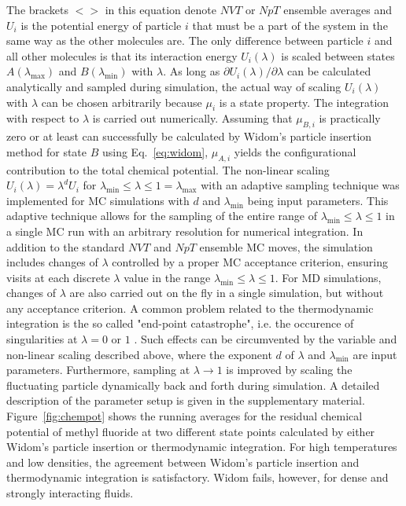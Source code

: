 \documentclass[preprint,12pt]{elsarticle}
\begin{document}
The brackets $<>$ in this equation denote $NVT$ or $NpT$ ensemble averages and $U_i$ is the potential energy of particle $i$ that must be a part of the system in the same way as the other molecules are. The only difference between particle $i$ and all other molecules is that its interaction energy $U_i(\lambda)$ is scaled between states $A(\lambda_\text{max})$ and $B(\lambda_\text{min})$ with $\lambda$. As long as $\partial U_i(\lambda)/\partial \lambda$ can be calculated analytically and sampled during simulation, the actual way of scaling $U_i(\lambda)$ with $\lambda$ can be chosen arbitrarily because $\mu_i$ is a state property. The integration with respect to $\lambda$ is carried out numerically. Assuming that $\mu_{B,i}$ is practically zero or at least can successfully be calculated by Widom’s particle insertion method for state $B$ using Eq.~\eqref{eq:widom}, $\mu_{A,i}$ yields the configurational contribution to the total chemical potential. The non-linear scaling $U_i(\lambda)=\lambda^d U_i$ for $\lambda_\text{min} \leq \lambda \leq 1 = \lambda_\text{max}$ with an adaptive sampling technique \cite{kri07} was implemented for MC simulations with $d$ and $\lambda_\text{min}$ being input parameters. This adaptive technique allows for the sampling of the entire range of $\lambda_\text{min} \leq \lambda \leq 1$ in a single MC run with an arbitrary resolution for numerical integration. In addition to the standard $NVT$ and $NpT$ ensemble MC moves, the simulation includes changes of $\lambda$ controlled by a proper MC acceptance criterion, ensuring visits at each discrete $\lambda$ value in the range $\lambda_\text{min} \leq \lambda \leq 1$. For MD simulations, changes of $\lambda$ are also carried out on the fly in a single simulation, but without any acceptance criterion. \textcolor[rgb]{0,0.58,0}{A common problem related to the thermodynamic integration is the so called "end-point catastrophe", i.e. the occurence of singularities at $\lambda = 0$ or $1$ \cite{mezei1986free, fleischman1991free, steinbrecher2007nonlinear}. Such effects can be circumvented by the variable and non-linear scaling described above, where the exponent $d$ of $\lambda$ and $\lambda_\text{min}$ are input parameters. Furthermore, sampling at $\lambda \rightarrow 1$ is improved by scaling the fluctuating particle dynamically back and forth during simulation.} A detailed description of the parameter setup is given in the supplementary material. Figure~\ref{fig:chempot} shows the running averages for the residual chemical potential of methyl fluoride at two different state points calculated by either Widom's particle insertion or thermodynamic integration. For high temperatures and low densities, the agreement between Widom's particle insertion and thermodynamic integration is satisfactory. Widom fails, however, for dense and strongly interacting fluids.  \\
\end{document}
